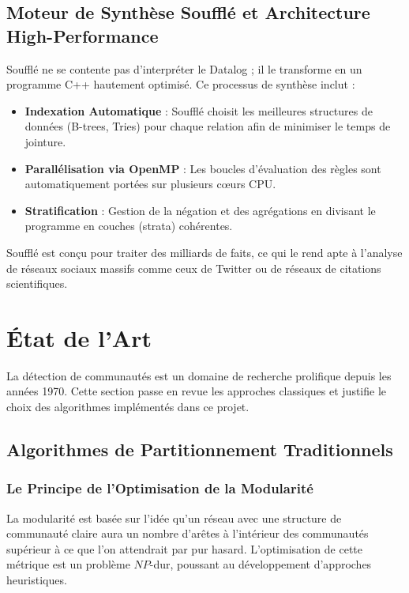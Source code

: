 \documentclass[12pt,a4paper]{report}
\begin{document}
\section{Moteur de Synthèse Soufflé et Architecture High-Performance}
Soufflé ne se contente pas d'interpréter le Datalog ; il le transforme en un programme C++ hautement optimisé. Ce processus de synthèse inclut :
\begin{itemize}
    \item \textbf{Indexation Automatique} : Soufflé choisit les meilleures structures de données (B-trees, Tries) pour chaque relation afin de minimiser le temps de jointure.
    \item \textbf{Parallélisation via OpenMP} : Les boucles d'évaluation des règles sont automatiquement portées sur plusieurs cœurs CPU.
    \item \textbf{Stratification} : Gestion de la négation et des agrégations en divisant le programme en couches (strata) cohérentes.
\end{itemize}
Soufflé est conçu pour traiter des milliards de faits, ce qui le rend apte à l'analyse de réseaux sociaux massifs comme ceux de Twitter ou de réseaux de citations scientifiques.

\chapter{État de l'Art}
La détection de communautés est un domaine de recherche prolifique depuis les années 1970. Cette section passe en revue les approches classiques et justifie le choix des algorithmes implémentés dans ce projet.

\section{Algorithmes de Partitionnement Traditionnels}
\subsection{Le Principe de l'Optimisation de la Modularité}
La modularité est basée sur l'idée qu'un réseau avec une structure de communauté claire aura un nombre d'arêtes à l'intérieur des communautés supérieur à ce que l'on attendrait par pur hasard. L'optimisation de cette métrique est un problème $NP$-dur, poussant au développement d'approches heuristiques.
\end{document}
